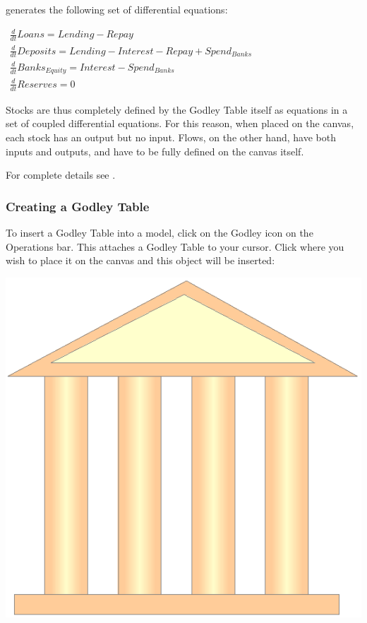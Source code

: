 generates the following set of differential equations:

$\begin{array}{c}
\frac{d}{dt}Loans=Lending-Repay\\
\frac{d}{dt}Deposits=Lending-Interest-Repay+Spend_{Banks}\\
\frac{d}{dt}Banks_{Equity}=Interest-Spend_{Banks}\\
\frac{d}{dt}Reserves=0
\end{array}$

Stocks are thus completely defined by the Godley Table itself as equations
in a set of coupled differential equations. For this reason, when
placed on the canvas, each stock has an output but no input. Flows,
on the other hand, have both inputs and outputs, and have to be fully
defined on the canvas itself.

For complete details see .

\subsubsection{Creating a Godley Table}

To insert a Godley Table into a model, click on the Godley icon on
the Operations bar. This attaches a Godley Table to your cursor. Click
where you wish to place it on the canvas and this object will be inserted:

\noindent\includegraphics[width=\textwidth]{images/GodleyTableIconMode}

